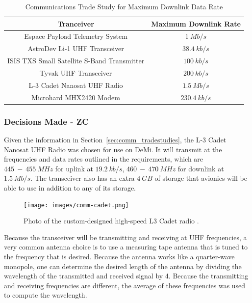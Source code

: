 \documentclass[12pt]{article}
\begin{document}
\begin{table}[ht]
\caption{Communications Trade Study for Maximum Downlink Data Rate}
\label{table:comm_transceivers}
\begin{center}
    \begin{tabular}{| c | c |} \hline
    	Tranceiver & Maximum Downlink Rate \\ \hline \hline
Espace Payload Telemetry System & $1\ Mb/s$ \\
AstroDev Li-1 UHF Transceiver & $38.4\ kb/s$ \\
ISIS TXS Small Satellite  S-Band Transmitter & $100\ kb/s$ \\
Tyvak UHF Transceiver & $200\ kb/s$ \\
L-3 Cadet Nanosat UHF Radio & $1.5\ Mb/s$ \\
Microhard MHX2420 Modem & $230.4\ kb/s$ \\ \hline 
    \end{tabular}
\end{center}
\end{table}

			\subsubsection{Decisions Made - ZC}

Given the information in Section~\ref{sec:comm_tradestudies}, the L-3 Cadet Nanosat UHF Radio was chosen for use on DeMi. It will transmit at the frequencies and data rates outlined in the requirements, which are $445\ -\ 455\ MHz$ for uplink at $19.2\ kb/s$, $460\ -\ 470\ MHz$ for downlink at $1.5\ Mb/s$. The transceiver also has an extra $4\ GB$ of storage that avionics will be able to use in addition to any of its storage. 

\begin{figure}[ht]\label{fig:comm_Cadet}
\centering
  \texttt{[image: images/comm-cadet.png]}
\caption{Photo of the custom-designed high-speed L3 Cadet radio \cite{DICE}.}
\end{figure}

Because the transceiver will be transmitting and receiving at UHF frequencies, a very common antenna choice is to use a measuring tape antenna that is tuned to the frequency that is desired. Because the antenna works like a quarter-wave monopole, one can determine the desired length of the antenna by dividing the wavelength of the transmitted and received signal by 4. Because the transmitting and receiving frequencies are different, the average of these frequencies was used to compute the wavelength. 
\end{document}
